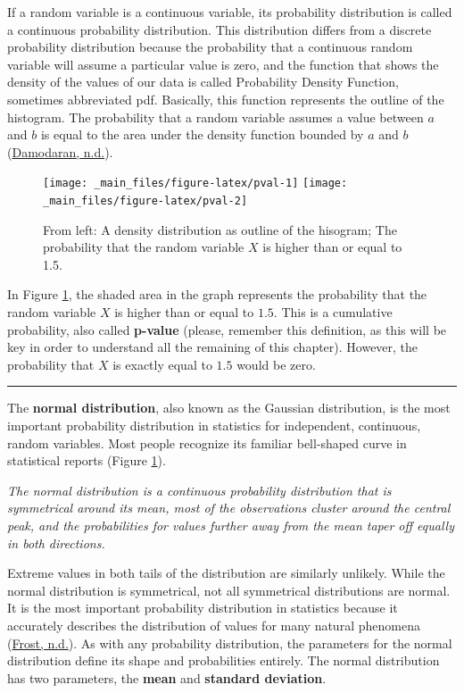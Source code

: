 \documentclass[
]{svmono}
\begin{document}
If a random variable is a continuous variable, its probability
distribution is called a continuous probability distribution. This
distribution differs from a discrete probability distribution because
the probability that a continuous random variable will assume a
particular value is zero, and the function that shows the density of the
values of our data is called Probability Density Function, sometimes
abbreviated pdf. Basically, this function represents the outline of the
histogram. The probability that a random variable assumes a value
between \(a\) and \(b\) is equal to the area under the density function
bounded by \(a\) and \(b\) (\protect\hyperlink{ref-damodaran}{Damodaran, n.d.}).

\begin{figure}[H]
\texttt{[image: \_main\_files/figure-latex/pval-1]} \texttt{[image: \_main\_files/figure-latex/pval-2]} \caption{From left: A density distribution as outline of the hisogram; The probability that the random variable $X$ is higher than or equal to 1.5.}\label{fig:pval}
\end{figure}

In Figure \ref{fig:pval}, the shaded area in the graph represents the probability
that the random variable \(X\) is higher than or equal to \(1.5\). This is a
cumulative probability, also called \textbf{p-value} (please, remember this
definition, as this will be key in order to understand all the remaining
of this chapter). However, the probability that \(X\) is exactly equal to
\(1.5\) would be zero.

\begin{center}\rule{0.5\linewidth}{0.5pt}\end{center}

The \textbf{normal distribution}, also known as the Gaussian distribution, is
the most important probability distribution in statistics for
independent, continuous, random variables. Most people recognize its
familiar bell-shaped curve in statistical reports (Figure \ref{fig:pval}).

\emph{The normal distribution is a continuous probability distribution that
is symmetrical around its mean, most of the observations cluster around
the central peak, and the probabilities for values further away from the
mean taper off equally in both directions.}

Extreme values in both tails of the distribution are similarly unlikely.
While the normal distribution is symmetrical, not all symmetrical
distributions are normal. It is the most important probability
distribution in statistics because it accurately describes the
distribution of values for many natural phenomena (\protect\hyperlink{ref-frost}{Frost, n.d.}). As with any
probability distribution, the parameters for the normal distribution
define its shape and probabilities entirely. The normal distribution has
two parameters, the \textbf{mean} and \textbf{standard deviation}.
\end{document}
